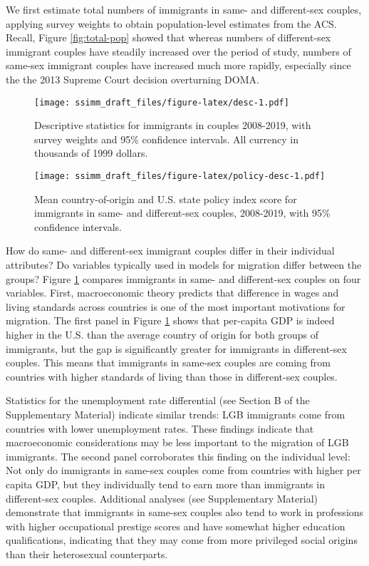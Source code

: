 \documentclass[
  12pt,
]{article}
\begin{document}
We first estimate total numbers of immigrants in same- and different-sex couples, applying survey weights to obtain population-level estimates from the ACS. Recall, Figure \ref{fig:total-pop} showed that whereas numbers of different-sex immigrant couples have steadily increased over the period of study, numbers of same-sex immigrant couples have increased much more rapidly, especially since the the 2013 Supreme Court decision overturning DOMA.

\begin{figure}
\centering
\texttt{[image: ssimm\_draft\_files/figure-latex/desc-1.pdf]}
\caption{\label{fig:desc}Descriptive statistics for immigrants in couples 2008-2019, with survey weights and 95\% confidence intervals. All currency in thousands of 1999 dollars.}
\end{figure}

\begin{figure}
\centering
\texttt{[image: ssimm\_draft\_files/figure-latex/policy-desc-1.pdf]}
\caption{\label{fig:policy-desc}Mean country-of-origin and U.S. state policy index score for immigrants in same- and different-sex couples, 2008-2019, with 95\% confidence intervals.}
\end{figure}

How do same- and different-sex immigrant couples differ in their individual attributes? Do variables typically used in models for migration differ between the groups? Figure \ref{fig:desc} compares immigrants in same- and different-sex couples on four variables. First, macroeconomic theory predicts that difference in wages and living standards across countries is one of the most important motivations for migration. The first panel in Figure \ref{fig:desc} shows that per-capita GDP is indeed higher in the U.S. than the average country of origin for both groups of immigrants, but the gap is significantly greater for immigrants in different-sex couples. This means that immigrants in same-sex couples are coming from countries with higher standards of living than those in different-sex couples.

Statistics for the unemployment rate differential (see Section B of the Supplementary Material) indicate similar trends: LGB immigrants come from countries with lower unemployment rates. These findings indicate that macroeconomic considerations may be less important to the migration of LGB immigrants. The second panel corroborates this finding on the individual level: Not only do immigrants in same-sex couples come from countries with higher per capita GDP, but they individually tend to earn more than immigrants in different-sex couples. Additional analyses (see Supplementary Material) demonstrate that immigrants in same-sex couples also tend to work in professions with higher occupational prestige scores and have somewhat higher education qualifications, indicating that they may come from more privileged social origins than their heterosexual counterparts.
\end{document}
